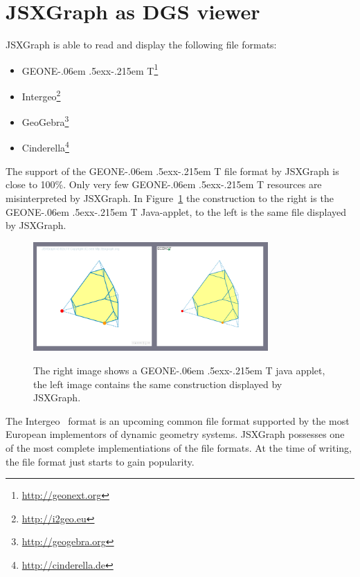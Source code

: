 \documentclass[12pt,a4paper]{article}%
\def\GEONExT{GEONE\kern-.06em \lower.5ex\hbox{x}\kern-.215em T}
\begin{document}
\section{JSXGraph as DGS viewer}
JSXGraph is able to read and display the following file formats:
\begin{itemize} 
\item \GEONExT{}\footnote{\href{http://geonext.org}{http://geonext.org}} 	
	\cite{ehmann2003,ehmann2008}
\item Intergeo\footnote{\href{http://i2geo.eu}{http://i2geo.eu}} \cite{kortenkamp2009}
\item GeoGebra\footnote{\href{geogebra.org}{http://geogebra.org}} \cite{hohenwarter2005}
\item Cinderella\footnote{\href{http://cinderella.de}{http://cinderella.de}} \cite{kortenkamp1999}
\end{itemize}
The support of the \GEONExT{} file format by JSXGraph is close to 100\%. 
Only very few \GEONExT{} resources are misinterpreted by JSXGraph. 
In Figure~\ref{fig:geonext} the construction to the right is the \GEONExT{} Java-applet, to the left is the same file displayed by JSXGraph.
\begin{figure}[ht]
\begin{center}
\includegraphics[width=0.8\textwidth]{geonext.png}\\
\caption{The right image shows a \GEONExT{} java applet, 
the left image contains the same construction displayed 
by JSXGraph.}\label{fig:geonext}
\end{center}
\end{figure}

The Intergeo~\cite{kortenkamp2009} format is an upcoming common file format supported by the most European implementors of dynamic geometry systems. JSXGraph possesses one of the most complete  implementiations of the file formats. At the time of writing, the file format just starts to gain popularity. 
\end{document}
